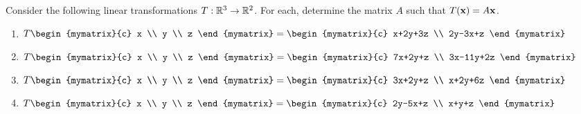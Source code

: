 \begin{ex}
  Consider the following linear transformations
  $T:\mathbb{R}^3\rightarrow \mathbb{R}^2$.  For each, determine the matrix $A$
  such that $T(\vect{x})=A\vect{x}$.
  \begin{enumerate}
  \item $T\begin{mymatrix}{c}
      x \\
      y \\
      z
    \end{mymatrix} =\begin{mymatrix}{c}
      x+2y+3z \\
      2y-3x+z
    \end{mymatrix} $

  \item $T\begin{mymatrix}{c}
      x \\
      y \\
      z
    \end{mymatrix} =\begin{mymatrix}{c}
      7x+2y+z \\
      3x-11y+2z
    \end{mymatrix} $

  \item $T\begin{mymatrix}{c}
      x \\
      y \\
      z
    \end{mymatrix} =\begin{mymatrix}{c}
      3x+2y+z \\
      x+2y+6z
    \end{mymatrix} $

  \item $T\begin{mymatrix}{c}
      x \\
      y \\
      z
    \end{mymatrix} =\begin{mymatrix}{c}
      2y-5x+z \\
      x+y+z
    \end{mymatrix} $
  \end{enumerate}
\end{ex}

